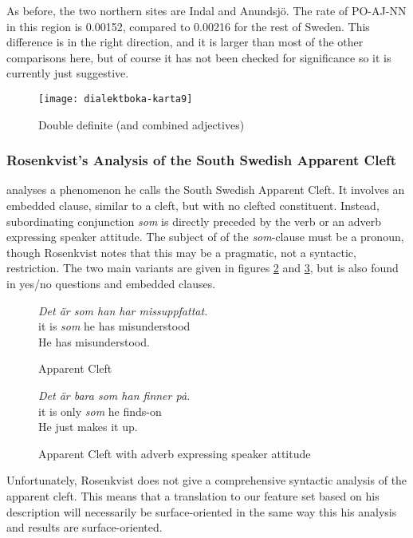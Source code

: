 As before, the two northern sites are Indal and Anundsj\"o. The rate
of PO-AJ-NN in this region is 0.00152, compared to 0.00216 for the
rest of Sweden. This difference is in the right direction, and it is
larger than most of the other comparisons here, but of course it has
not been checked for significance so it is currently just suggestive.

\begin{figure}
  \texttt{[image: dialektboka-karta9]}
  \caption{Double definite (and combined adjectives)}
  \label{double-definite-map}
\end{figure}

\subsubsection{Rosenkvist's Analysis of the South Swedish Apparent Cleft}

 analyses a phenomenon he calls the South
Swedish Apparent Cleft. It involves an embedded clause, similar to a
cleft, but with no clefted constituent. Instead, subordinating
conjunction {\it som} is directly preceded by the verb or an adverb
expressing speaker attitude. The subject of of the {\it som}-clause
must be a pronoun, though Rosenkvist notes that this may be a
pragmatic, not a syntactic, restriction. The two main variants are
given in figures \ref{apparent-cleft-example1} and
\ref{apparent-cleft-example2}, but is also found in yes/no questions
and embedded clauses.

\begin{figure}
  {\it Det \"ar som han har missuppfattat.} \\
  it is {\it som} he has misunderstood \\
  He has misunderstood.
  \caption{Apparent Cleft}
  \label{apparent-cleft-example1}
\end{figure}

\begin{figure}
  {\it Det \"ar bara som han finner p\.a.} \\
  it is only {\it som} he finds-on \\
  He just makes it up.
  \caption{Apparent Cleft with adverb expressing speaker attitude}
  \label{apparent-cleft-example2}
\end{figure}

Unfortunately, Rosenkvist does not give a comprehensive syntactic
analysis of the apparent cleft. This means that a translation to our
feature set based on his description will necessarily be
surface-oriented in the same way this his analysis and results are
surface-oriented.

